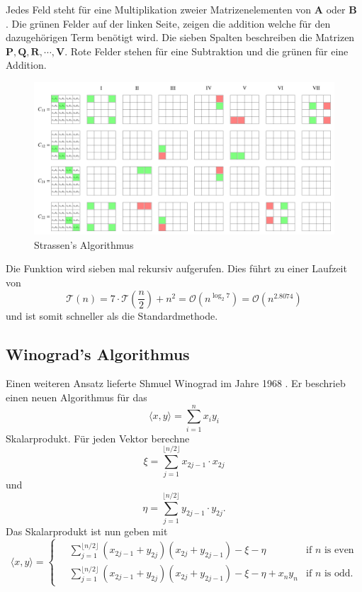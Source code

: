 Jedes Feld steht f\"ur eine Multiplikation zweier Matrizenelementen von $\mathbf{A}$ oder $\mathbf{B}$ .
Die gr\"unen Felder auf der linken Seite, zeigen die addition welche f\"ur den dazugeh\"origen Term ben\"otigt wird.
Die sieben Spalten beschreiben die Matrizen $\mathbf{P,Q,R, \dotsb, V}$.
Rote Felder stehen f\"ur eine Subtraktion und die gr\"unen f\"ur eine Addition.
\begin{figure}
	\center
	\includegraphics[width=\linewidth]{papers/multiplikation/images/strassen.pdf}
	\caption{Strassen's Algorithmus}
	\label{multiplikation:fig:strassen}
\end{figure}

Die Funktion wird sieben mal rekursiv aufgerufen.
Dies f\"uhrt zu einer Laufzeit von
\begin{equation} \label{multiplikation:eq:laufzeitstrassen}
\mathcal{T}(n) =
7 \cdot \mathcal{T}(\frac{n}{2}) + n^2  = \mathcal{O}\left(n^{\log_2 7}\right ) = \mathcal{O}\left(n^{2.8074} \right )
\end{equation}
und ist somit schneller als die Standardmethode.

\subsection{Winograd's Algorithmus}

Einen weiteren Ansatz lieferte Shmuel Winograd im Jahre 1968 \cite{multiplikation:winograd_1968}.
Er beschrieb einen neuen Algorithmus f\"ur das
\begin{equation}
	\langle x,y \rangle = \sum_{i=1}^{n}x_i y_i
\end{equation}
Skalarprodukt.
F\"ur jeden Vektor berechne
\begin{equation}
	\xi = \sum_{j=1}^{ \lfloor n/2 \rfloor} x_{2j-1} \cdot x_{2j}
\end{equation}
und
\begin{equation}
	\eta = \sum_{j=1}^{ \lfloor n/2 \rfloor} y_{2j-1} \cdot y_{2j}.
\end{equation}
Das Skalarprodukt ist nun geben mit
\begin{equation}
	\langle x,y \rangle =
	\begin{cases}
	 \displaystyle \quad \sum_{j=1}^{ \lfloor n/2 \rfloor} (x_{2j-1} + y_{2j})(x_{2j}+y_{2j-1})-\xi - \eta & \text{if  $n$ is even}\\
	\displaystyle  \quad \sum_{j=1}^{ \lfloor n/2 \rfloor} (x_{2j-1} + y_{2j})(x_{2j}+y_{2j-1})-\xi - \eta + x_n y_n & \text{if  $n$ is odd}.
	\end{cases}
\end{equation}

